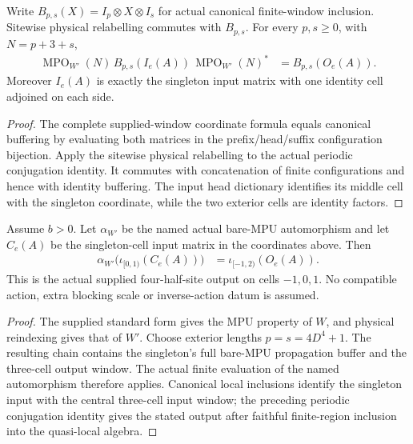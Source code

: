 \begin{lemma}
    \label{lem:mpu_supplied_relabel_buffered_conjugation}
    \notready
    Write $B_{p,s}(X)=I_p\otimes X\otimes I_s$ for actual canonical
    finite-window inclusion. Sitewise physical relabelling commutes with
    $B_{p,s}$. For every $p,s\ge0$, with $N=p+3+s$,
    \begin{align}
        \operatorname{MPO}_{W'}(N)\,B_{p,s}(I_e(A))\,
        \operatorname{MPO}_{W'}(N)^* & =B_{p,s}(O_e(A)).
    \end{align}
    Moreover $I_e(A)$ is exactly the singleton input matrix with one
    identity cell adjoined on each side.
\end{lemma}
\begin{proof}
    \notready
    The complete supplied-window coordinate formula equals canonical
    buffering by evaluating both matrices in the prefix/head/suffix
    configuration bijection. Apply the sitewise physical relabelling
    to the actual periodic conjugation identity. It commutes with
    concatenation of finite configurations and hence with identity
    buffering. The input head dictionary identifies its middle cell
    with the singleton coordinate, while the two exterior cells are
    identity factors.
\end{proof}

\begin{lemma}
    \label{lem:mpu_supplied_named_singleton_action}
    \notready
    Assume $b>0$. Let $\alpha_{W'}$ be the named actual bare-MPU
    automorphism and let $C_e(A)$ be the singleton-cell input matrix in
    the coordinates above. Then
    \begin{align}
        \alpha_{W'}\bigl(\iota_{[0,1)}(C_e(A))\bigr)
         & =\iota_{[-1,2)}(O_e(A)).
    \end{align}
    This is the actual supplied four-half-site output on cells $-1,0,1$.
    No compatible action, extra blocking scale or inverse-action datum
    is assumed.
\end{lemma}
\begin{proof}
    \notready
    The supplied standard form gives the MPU property of $W$, and
    physical reindexing gives that of $W'$. Choose exterior lengths
    $p=s=4D^4+1$. The resulting chain contains the singleton's full
    bare-MPU propagation buffer and the three-cell output window. The
    actual finite evaluation of the named automorphism therefore
    applies. Canonical local inclusions identify the singleton input
    with the central three-cell input window; the preceding periodic
    conjugation identity gives the stated output after faithful
    finite-region inclusion into the quasi-local algebra.
\end{proof}
